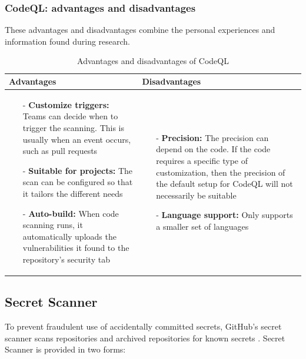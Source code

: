\subsubsection{CodeQL: advantages and disadvantages}
These advantages and disadvantages combine the personal experiences and information found during research. 
\begin{table}[H]
\centering
\begin{tabular}{|>{\raggedright\arraybackslash}p{6cm}|>{\raggedright\arraybackslash}p{6cm}|}
\hline
\textbf{Advantages} & \textbf{Disadvantages} \\
\hline
\begin{itemize}
\item [-] \textbf{Customize triggers:} Teams can decide when to trigger the scanning. This is usually when an event occurs, such as pull requests
\vspace{5pt}
\item [-]\textbf{Suitable for projects:} The scan can be configured so that it tailors the different needs
\vspace{5pt}
\item [-] \textbf{Auto-build:} When code scanning runs, it automatically uploads the vulnerabilities it found to the repository's security tab
\end{itemize}
&
   \begin{itemize}
\item [-]\textbf{Precision:} The precision can depend on the code. If the code requires a specific type of customization, then the precision of the default setup for CodeQL will not necessarily be suitable 
\vspace{5pt}
\item [-] \textbf{Language support:} Only supports a smaller set of languages 
\end{itemize}
\\
\hline
\end{tabular}
\caption{Advantages and disadvantages of CodeQL}
\label{tab: CodeQL}
\end{table}


\subsection{Secret Scanner}
To prevent fraudulent use of accidentally committed secrets, GitHub's secret scanner scans repositories and archived repositories for known secrets \cite{GithubSecretScanning}. Secret Scanner is provided in two forms:  

